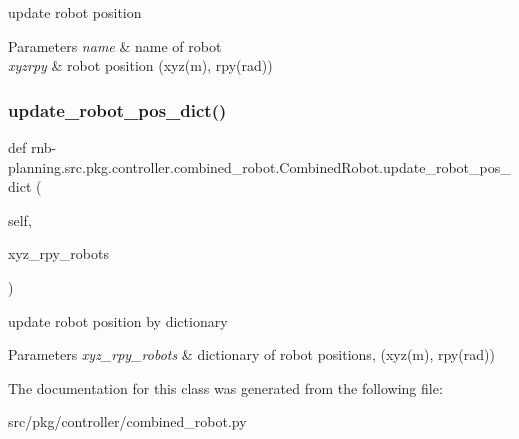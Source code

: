 update robot position 


\begin{DoxyParams}{Parameters}
{\em name} & name of robot \\
\hline
{\em xyzrpy} & robot position (xyz(m), rpy(rad)) \\
\hline
\end{DoxyParams}
\mbox{\label{classrnb-planning_1_1src_1_1pkg_1_1controller_1_1combined__robot_1_1_combined_robot_a9a9b8c7c2ee78d719658e4fe4e11521c}} 
\subsubsection{\texorpdfstring{update\+\_\+robot\+\_\+pos\+\_\+dict()}{update\_robot\_pos\_dict()}}
{\footnotesize\ttfamily def rnb-\/planning.\+src.\+pkg.\+controller.\+combined\+\_\+robot.\+Combined\+Robot.\+update\+\_\+robot\+\_\+pos\+\_\+dict (\begin{DoxyParamCaption}\item[{}]{self,  }\item[{}]{xyz\+\_\+rpy\+\_\+robots }\end{DoxyParamCaption})}



update robot position by dictionary 


\begin{DoxyParams}{Parameters}
{\em xyz\+\_\+rpy\+\_\+robots} & dictionary of robot positions, (xyz(m), rpy(rad)) \\
\hline
\end{DoxyParams}


The documentation for this class was generated from the following file\+:\begin{DoxyCompactItemize}
\item 
src/pkg/controller/combined\+\_\+robot.\+py\end{DoxyCompactItemize}
